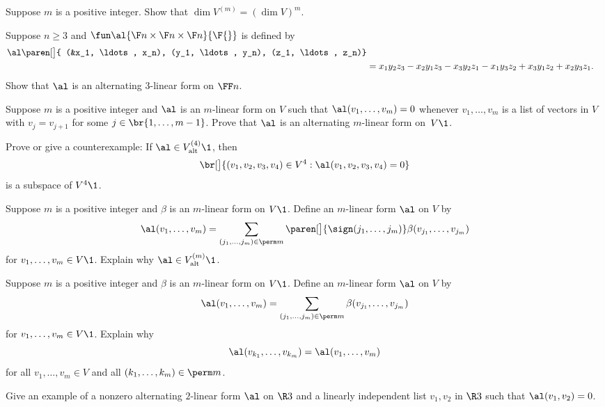 
\exercise
Suppose $m$ is a positive integer. Show that $\dim V^{(m)} = (\dim V)^m\!$.


\exercise
Suppose $n \ge 3$ and $\fun \al {\F n \times \F n \times \F n} {\F{}}$ is defined by
\begin{align*}
\al\paren[\big]{ (&x_1, \ldots, x_n), (y_1, \ldots, y_n), (z_1, \ldots, z_n)} \\
&= x_1 y_2 z_3 - x_2 y_1 z_3 - x_3 y_2 z_1
-x_1 y_3 z_2 + x_3 y_1 z_2 + x_2 y_3 z_1.
\end{align*}
Show that $\al$ is an alternating $3$-linear form on $\FF n$.\label{9threelin}


\exercise
Suppose $m$ is a positive integer and $\al$ is an $m$-linear form on $V$ such that $\al(v_1, \ldots, v_m) = 0$ whenever
$v_1, \ldots, v_m$ is a list of vectors in $V$ with $v_j = v_{j+1}$ for some $j \in \br{1, \ldots, m-1}$. Prove that $\al$ is an alternating $m$-linear form on~$V\1$.


\exercise
Prove or give a counterexample: If $\al \in V_\text{alt}^{(4)}\1$, then
\[
\br[\big]{ (v_1, v_2, v_3, v_4) \in V^4 : \al(v_1, v_2, v_3, v_4) = 0 }
\]
is a subspace of $V^4\1$.


\exercise
Suppose $m$ is a positive integer and $\beta$ is an $m$-linear form on $V\1$. Define an $m$-linear form $\al$ on $V$ by
\[
\al(v_1, \ldots, v_m) =
\sum_{(j_1, \ldots, j_m) \in \perm m} \paren[\big]{ \sign(j_1, \ldots, j_m) } \beta( v_{j_1}, \ldots, v_{j_m} )
\]
for $v_1, \ldots, v_m \in V\1$. Explain why $\al \in V_{\text{alt}}^{(m)}\1$.


\exercise
Suppose $m$ is a positive integer and $\beta$ is an $m$-linear form on $V\1$. Define an $m$-linear form $\al$ on $V$ by
\[
\al(v_1, \ldots, v_m) =
\sum_{(j_1, \ldots, j_m) \in \perm m} \beta( v_{j_1}, \ldots, v_{j_m} )
\]
for $v_1, \ldots, v_m \in V\1$. Explain why
\[
\al( v_{k_1}, \ldots, v_{k_m} ) = \al(v_1, \ldots, v_m)
\]
for all $v_1, \ldots, v_m \in V$ and all $(k_1, \ldots, k_m) \in \perm m$.


\exercise
Give an example of a nonzero alternating $2$-linear form $\al$ on $\R3$ and a linearly independent list $v_1, v_2$ in $\R3$ such that
$\al(v_1, v_2) = 0$.


